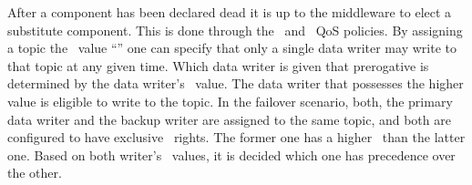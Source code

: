 After a component has been declared dead it is up to the middleware to elect a substitute component. This is done through the \ownership\ and \ostrength\ QoS policies. By assigning a topic the \ownership\ value ``'' one can specify that only a single data writer may write to that topic at any given time. Which data writer is given that prerogative is determined by the data writer's \ostrength\ value. The data writer that possesses the higher value is eligible to write to the topic. In the failover scenario, both, the primary data writer and the backup writer are assigned to the same topic, and both are configured to have exclusive \ownership\ rights. The former one has a higher \ostrength\ than the latter one. Based on both writer's \ostrength\ values, it is decided which one has precedence over the other.
%
%
%
%
%
%
%
%
%
%
%
%


